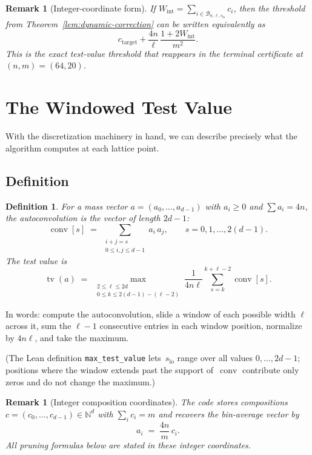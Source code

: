 \documentclass[11pt, letterpaper]{article}
\theoremstyle{paperplain}
\theoremstyle{paperdef}
\newtheorem{definition}[theorem]{Definition}
\newtheorem{remark}[theorem]{Remark}
\newcommand{\N}{\mathbb{N}}
\newcommand{\tv}{\operatorname{tv}}
\newcommand{\conv}{\operatorname{conv}}
\begin{document}
\begin{remark}[Integer-coordinate form]
If
$W_{\mathrm{int}}=\sum_{i\in\mathcal{B}_{n,\ell,s_{\mathrm{lo}}}} c_i$,
then the threshold from
Theorem~\ref{lem:dynamic-correction} can be written equivalently as
\[
  c_{\mathrm{target}}
  +
  \frac{4n}{\ell}\,
  \frac{1+2W_{\mathrm{int}}}{m^2}.
\]
This is the exact test-value threshold that reappears in the terminal
certificate at $(n,m)=(64,20)$.
\end{remark}

\section{The Windowed Test Value}\label{sec:testvalue}

With the discretization machinery in hand, we can describe precisely
what the algorithm computes at each lattice point.

\subsection{Definition}

\begin{definition}
For a mass vector $a = (a_0, \ldots, a_{d-1})$ with $a_i \ge 0$ and
$\sum a_i = 4n$, the \emph{autoconvolution} is the vector of length
$2d - 1$:
\[
  \conv[s] \;=\; \sum_{\substack{i + j = s \\[1pt] 0 \le i,j \le d-1}}
  a_i\, a_j,
  \qquad s = 0, 1, \ldots, 2(d-1).
\]
The \emph{test value} is
\[
  \tv(a) \;=\;
  \max_{\substack{2 \le \ell \le 2d \\[2pt] 0 \le k \le 2(d-1) - (\ell-2)}}
  \frac{1}{4n\ell}
  \sum_{s=k}^{k+\ell-2} \conv[s].
\]
\end{definition}

In words: compute the autoconvolution, slide a window of each possible
width $\ell$ across it, sum the $\ell - 1$ consecutive entries in each
window position, normalize by $4n\ell$, and take the maximum.

(The Lean definition \texttt{max\_test\_value} lets~$s_{\mathrm{lo}}$
range over all values $0,\dots,2d-1$; positions where the window extends
past the support of~$\conv$ contribute only zeros and do not change the
maximum.)

\begin{remark}[Integer composition coordinates]
The code stores compositions
$c=(c_0,\ldots,c_{d-1}) \in \N^d$ with $\sum_i c_i = m$ and recovers
the bin-average vector by
\[
  a_i \;=\; \frac{4n}{m}\,c_i.
\]
All pruning formulas below are stated in these integer
coordinates.
\end{remark}
\end{document}
